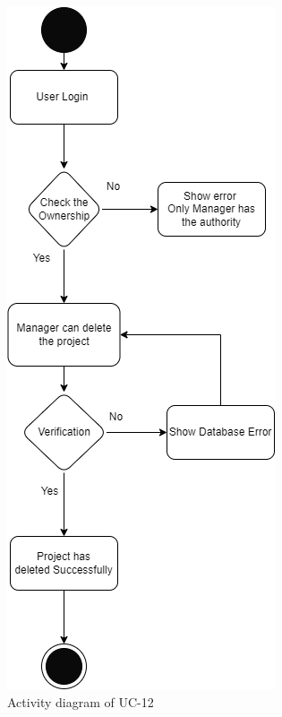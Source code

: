 \begin{figure}[H]
    \centering
    \includegraphics[scale=0.7]{./diagrams/Activity Diagram/ad-12.png}
    \caption{Activity diagram of UC-12}
    \label{fig:act-12}

\end{figure}


